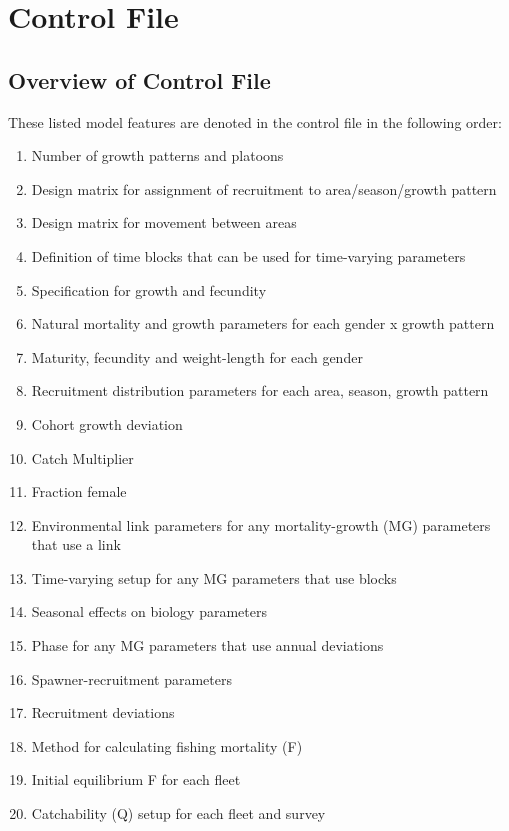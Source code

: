 \section{Control File}
\subsection{Overview of Control File}
These listed model features are denoted in the control file in the following order:
	\begin{enumerate}
		\itemsep0em
		\item Number of growth patterns and platoons
		\item Design matrix for assignment of recruitment to area/season/growth pattern
		\item Design matrix for movement between areas
		\item Definition of time blocks that can be used for time-varying parameters
		\\
		\item Specification for growth and fecundity
		\item Natural mortality and growth parameters for each gender x growth pattern
		\item Maturity, fecundity and weight-length for each gender
		\item Recruitment distribution parameters for each area, season, growth pattern
		\item Cohort growth deviation
		\item Catch Multiplier
		\item Fraction female
		\item Environmental link parameters for any mortality-growth (MG) parameters that use a link
		\item Time-varying setup for any MG parameters that use blocks
		\item Seasonal effects on biology parameters
		\item Phase for any MG parameters that use annual deviations
		\\
		\item Spawner-recruitment parameters
		\item Recruitment deviations
		\\
		\item Method for calculating fishing mortality (F)
		\item Initial equilibrium F for each fleet
		\\
		\item Catchability (Q) setup for each fleet and survey

\end{enumerate}
